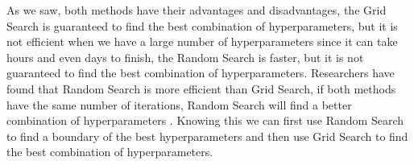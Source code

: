 As we saw, both methods have their advantages and disadvantages, the Grid Search is guaranteed to find the best combination of hyperparameters, but it is not efficient when we have a large number of hyperparameters since it can take hours and even days to finish, the Random Search is faster, but it is not guaranteed to find the best combination of hyperparameters. Researchers have found that Random Search is more efficient than Grid Search, if both methods have the same number of iterations, Random Search will find a better combination of hyperparameters \cite{bergstra_random_nodate}. Knowing this we can first use Random Search to find a boundary of the best hyperparameters and then use Grid Search to find the best combination of hyperparameters.